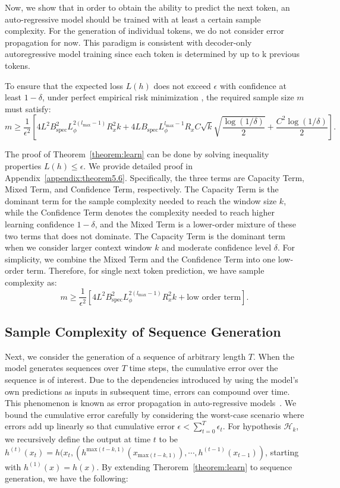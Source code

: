 Now, we show that in order to obtain the ability to predict the next token, an auto-regressive model should be trained with at least a certain sample complexity. For the generation of individual tokens, we do not consider error propagation for now. This paradigm is consistent with decoder-only autoregressive model training since each token is determined by up to k previous tokens.
\begin{theorem}\label{theorem:learn}
    To ensure that the expected loss \( L(h) \) does not exceed \( \epsilon \) with confidence at least \( 1 - \delta \), under perfect empirical risk minimization %
    , the required sample size \( m \) must satisfy:
\[
m \geq \frac{1}{\epsilon^2} \left[ 4 L^2 B_{\text{spec}}^2 L_{\phi}^{2(l_{\text{max}}-1)} R_x^2 k + 4 L B_{\text{spec}} L_{\phi}^{l_{\text{max}}-1} R_x C \sqrt{k} \sqrt{\frac{\log(1/\delta)}{2}} + \frac{C^2 \log(1/\delta)}{2} \right].
\]
\end{theorem}

The proof of Theorem~\ref{theorem:learn} can be done by solving inequality properties \(L(h)\leq \epsilon\). We provide detailed proof in Appendix~\ref{appendix:theorem5.6}. Specifically, the three terms are Capacity Term, Mixed Term, and Confidence Term, respectively. The Capacity Term is the dominant term for the sample complexity needed to reach the window size \(k\), while the Confidence Term denotes the complexity needed to reach higher learning confidence \(1-\delta\), and the Mixed Term is a lower-order mixture of these two terms that does not dominate. The Capacity Term is the dominant term when we consider larger context window \( k \) and moderate confidence level \( \delta \). For simplicity, we combine the Mixed Term and the Confidence Term into one low-order term. Therefore, for single next token prediction, we have sample complexity as:
\[
m \geq \frac{1}{\epsilon^{2} } \left[ 4 L^2 B_{\text{spec}}^2 L_{\phi}^{2(l_{\text{max}}-1)} R_x^2 k + \text{low order term} \right].
\]

\subsection{Sample Complexity of Sequence Generation}
Next, we consider the generation of a sequence of arbitrary length \(T\). When the model generates sequences over 
\(T\) time steps, the cumulative error over the sequence is of interest. Due to the dependencies introduced by using the model's own predictions as inputs in subsequent time, errors can compound over time. This phenomenon is known as error propagation in auto-regressive models~\citep{wu2018beyond}. We bound the cumulative error carefully by considering the worst-case scenario where errors add up linearly so that cumulative error \( \epsilon  < \sum_{t=0}^{T}\epsilon_t \). For hypothesis \( \mathcal{H}_k\), we recursively define the output at time \(t\) to be \(h^{(t)}(x_t) = h(x_t,(h^{\text{max}(t-k,1)}(x_{\text{max}(t-k,1)}),\cdots,h^{(t-1)}(x_{t-1}))\), starting with \(h^{(1)}(x) = h(x)\). By extending Therorem~\ref{theorem:learn} to sequence generation, we have the following:

